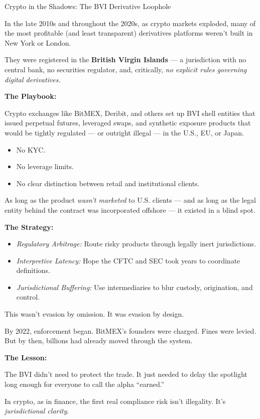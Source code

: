 \begin{HistoricalSidebar}{Crypto in the Shadows: The BVI Derivative Loophole}

  In the late 2010s and throughout the 2020s, as crypto markets exploded,  
  many of the most profitable (and least transparent) derivatives platforms  
  weren’t built in New York or London.
  
  They were registered in the \textbf{British Virgin Islands} —  
  a jurisdiction with no central bank, no securities regulator,  
  and, critically, \textit{no explicit rules governing digital derivatives.}
  
  \medskip
  
  \textbf{The Playbook:}
  
  Crypto exchanges like BitMEX, Deribit, and others set up BVI shell entities  
  that issued perpetual futures, leveraged swaps, and synthetic exposure products  
  that would be tightly regulated — or outright illegal — in the U.S., EU, or Japan.
  
  \begin{itemize}
    \item No KYC.  
    \item No leverage limits.  
    \item No clear distinction between retail and institutional clients.
  \end{itemize}
  
  \medskip
  
  As long as the product \textit{wasn’t marketed} to U.S. clients — and as long as  
  the legal entity behind the contract was incorporated offshore —  
  it existed in a blind spot.
  
  \medskip
  
  \textbf{The Strategy:}  
  \begin{itemize}
    \item \textit{Regulatory Arbitrage:} Route risky products through legally inert jurisdictions.  
    \item \textit{Interpretive Latency:} Hope the CFTC and SEC took years to coordinate definitions.  
    \item \textit{Jurisdictional Buffering:} Use intermediaries to blur custody, origination, and control.
  \end{itemize}
  
  \medskip
  
  This wasn’t evasion by omission.  
  It was evasion by design.
  
  By 2022, enforcement began.  
  BitMEX’s founders were charged. Fines were levied.  
  But by then, billions had already moved through the system.
  
  \medskip
  
  \textbf{The Lesson:}
  
  The BVI didn’t need to protect the trade.  
  It just needed to delay the spotlight long enough for  
  everyone to call the alpha “earned.”
  
  In crypto, as in finance, the first real compliance risk isn’t illegality.  
  It’s \textit{jurisdictional clarity}.
  
\end{HistoricalSidebar}

